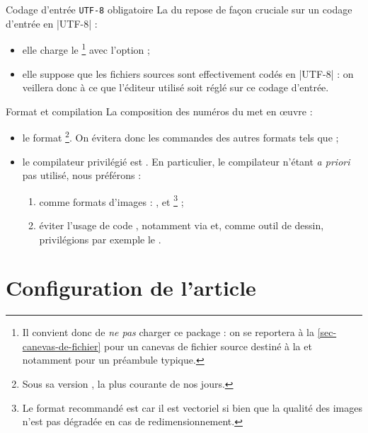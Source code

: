 \documentclass[french,nolocaltoc]{nwejmart}
\newtheorem[title=Fait,style=definition]{fact}
\begin{document}
\begin{dbwarning}{Codage d'entrée \protect\lstinline+UTF-8+ obligatoire}{}
  La \nwejmauthorcl{} du \nwejm{} repose de façon cruciale sur un codage
  d'entrée en |UTF-8| :
  \begin{itemize}
  \item elle charge le \footnote{%
      Il convient donc de \emph{ne pas} charger ce package : on se reportera
      à la \vref{sec-canevas-de-fichier} pour un canevas de fichier source
      destiné à la \nwejm{} et notamment pour un préambule typique.%
    }
    avec l'option  ;
  \item elle suppose que les fichiers sources  sont effectivement
    codés en |UTF-8| : on veillera donc à ce que l'éditeur utilisé soit réglé
    sur ce codage d'entrée.
  \end{itemize}
\end{dbwarning}

\begin{dbwarning}{Format et compilation }{}
  La composition des numéros du \nwejm*{} met en œuvre :
  \begin{itemize}
  \item le format \footnote{Sous sa version , la
      plus courante de nos jours.}. On évitera donc les commandes des autres
    formats tels que  ;
  \item le compilateur privilégié est . En particulier, le
    compilateur  n'étant \emph{a priori} pas utilisé, nous
    préférons :
    \begin{enumerate}
    \item comme formats d'images : ,  et
      \footnote{Le format recommandé est  car il est
        vectoriel si bien que la qualité des images n'est pas dégradée en cas de
        redimensionnement.} ;
    \item éviter l'usage de code , notamment via
       et, comme outil de dessin, privilégions par exemple le
      .
    \end{enumerate}
  \end{itemize}
\end{dbwarning}

\section{Configuration de l'article}
\end{document}
